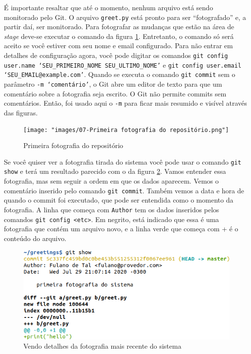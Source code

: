 \documentclass[a4paper]{book}
\begin{document}
É importante resaltar que até o momento, nenhum arquivo está
sendo monitorado pelo Git.
O arquivo \texttt{greet.py} está pronto para ser ``fotografado'' e,
a partir daí, ser monitorado.
Para fotografar as mudanças que estão na área de \textit{stage}
deve-se executar o comando da figura \ref{fig:07}.
Entretanto, o comando só será aceito se você estiver com 
seu nome e email configurado.
Para não entrar em detalhes de configuração agora, 
você pode digitar os comandos 
\texttt{git config user.name `SEU\_PRIMEIRO\_NOME SEU\_ULTIMO\_NOME'} e
\texttt{git config user.email `SEU\_EMAIL@example.com'}.
Quando se executa o comando \texttt{git commit} sem o parâmetro
\texttt{-m `comentário'}, o Git abre um editor de texto para que 
um comentário sobre a fotografia seja escrito.
O Git não permite commits sem comentários.
Então, foi usado aqui o \texttt{-m} para ficar mais resumido e 
visível através das figuras.

\begin{figure}[ht]
\caption{Primeira fotografia do repositório}
\label{fig:07}
\centering
\texttt{[image: "images/07-Primeira fotografia do repositório.png"]}
\end{figure}

Se você quiser ver a fotografia tirada do sistema
você pode usar o comando \texttt{git show} e terá um resultado
parecido com o da figura \ref{fig:08}.
Vamos entender essa fotografia, mas sem seguir a ordem em que 
os dados aparecem.
Vemos o comentário inserido pelo comando \texttt{git commit}.
Também vemos a data e hora de quando o commit foi executado,
que pode ser entendida como o momento da fotografia.
A linha que começa com \texttt{Author} tem os dados inseridos
pelos comandos \texttt{git config <etc>}.
Em negrito, está indicado que essa é uma fotografia que
contém um arquivo novo, e a linha verde que começa com +
é o conteúdo do arquivo.

\begin{figure}[ht]
\caption{Vendo detalhes da fotografia mais recente do sistema}
\label{fig:08}
\centering
\includegraphics[scale=0.6,left]{"images/08-Vendo detalhes da fotografia mais recente do sistema.png"}
\end{figure}
\end{document}
